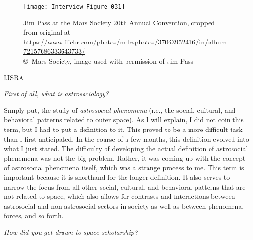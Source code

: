 \begin{figure}[!htb]
	\texttt{[image: Interview\_Figure\_031]}
	\centering
	\caption{Jim Pass at the Mars Society 20th Annual Convention, cropped from original at	\url{https://www.flickr.com/photos/mdrsphotos/37063952416/in/album-72157686333643733/}
		{\normalfont\scriptsize \\ \copyright\ Mars Society, image used with permission of Jim Pass
	}}
	\label{Interview_Figure_031}
\end{figure}

\begin{labeling}{IJSRA}
	\item[IJSRA (International Journal of Student Research in Archaeology)] \emph{First of all, what is \emph{astrosociology}?}

	\item[Jim Pass (JP)] Simply put, the study of \emph{astrosocial phenomena} (i.e., the social, cultural, and behavioral patterns related to outer space). As I will explain, I did not coin this term, but I had to put a definition to it. This proved to be a more difficult task than I first anticipated. In the course of a few months, this definition evolved into what I just stated. The difficulty of developing the actual definition of astrosocial phenomena was not the big problem. Rather, it was coming up with the concept of astrosocial phenomena itself, which was a strange process to me. This term is important because it is shorthand for the longer definition. It also serves to narrow the focus from all other social, cultural, and behavioral patterns that are not related to space, which also allows for contrasts and interactions between astrosocial and non-astrosocial sectors in society as well as between phenomena, forces, and so forth.

	\item[IJSRA] \emph{How did you get drawn to space scholarship?}


\end{labeling}
